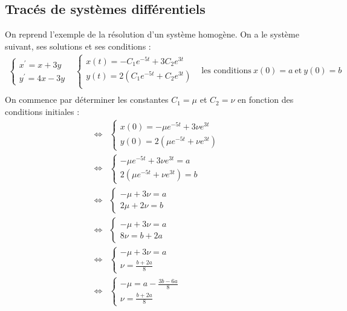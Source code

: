 \subsection{Tracés de systèmes différentiels}
\begin{ex}
On reprend l'exemple de la résolution d'un système homogène. On a le système suivant, ses solutions et ses conditions :
$$\begin{array}{ccc}
    \begin{cases}x^{\prime}=x+3y\\y^{\prime}=4x-3y\end{cases} & \begin{cases}x(t)=-C_1e^{-5t}+3C_2e^{3t}\\y(t)=2(C_1e^{-5t}+C_2e^{3t})\\\end{cases} & \text{les conditions}\ x(0)=a\ \text{et}\ y(0)=b\\
\end{array}$$
On commence par déterminer les constantes $C_1=\mu$ et $C_2=\nu$ en fonction des conditions initiales :
\begin{align*}
    \Leftrightarrow & \begin{cases}x(0)=-\mu e^{-5t}+3\nu e^{3t}\\y(0)=2(\mu e^{-5t}+\nu e^{3t})\end{cases}\\
    \Leftrightarrow & \begin{cases}-\mu e^{-5t}+3\nu e^{3t}=a\\2(\mu e^{-5t}+\nu e^{3t})=b\end{cases}\\
    \Leftrightarrow & \begin{cases}-\mu +3\nu=a\\2\mu+2\nu=b\end{cases}\\
    \Leftrightarrow & \begin{cases}-\mu+3\nu=a\\8\nu=b+2a\end{cases}\\
    \Leftrightarrow & \begin{cases}-\mu+3\nu=a\\\nu = \frac{b+2a}{8}\end{cases}\\
    \Leftrightarrow & \begin{cases}-\mu =a-\frac{3b-6a}{8}\\\nu=\frac{b+2a}{8}\end{cases}\\

\end{align*}
\end{ex}
